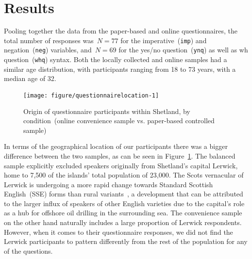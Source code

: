 \section{Results}

Pooling together the data from the paper-based and online questionnaires, the total number of responses was~$N=77$ for the imperative~(\texttt{imp}) and negation~(\texttt{neg}) variables, and~$N=69$ for the yes/no question~(\texttt{ynq}) as well as wh question~(\texttt{whq}) syntax. Both the locally collected and online samples had a similar age distribution, with participants ranging from 18 to 73 years, with a median age of 32.




\begin{figure}[htbp]

{\centering \texttt{[image: figure/questionnairelocation-1]} 

}

\caption[Origin of questionnaire participants within Shetland, by condition]{Origin of questionnaire participants within Shetland, by condition~(online convenience sample vs. paper-based controlled sample)}\label{fig:questionnairelocation}
\end{figure}



In terms of the geographical location of our participants there was a bigger difference between the two samples, as can be seen in Figure~\ref{fig:questionnairelocation}. The balanced sample explicitly excluded speakers originally from Shetland's capital Lerwick, home to 7,500 of the islands' total population of 23,000. The Scots vernacular of Lerwick is undergoing a more rapid change towards Standard Scottish English~(SSE) forms than rural variants~\citep{Sundkvist2011}, a development that can be attributed to the larger influx of speakers of other English varieties due to the capital's role as a hub for offshore oil drilling in the surrounding sea.
The convenience sample on the other hand naturally includes a large proportion of Lerwick respondents. However, when it comes to their questionnaire responses, we did not find the Lerwick participants to pattern differently from the rest of the population for any of the questions.

